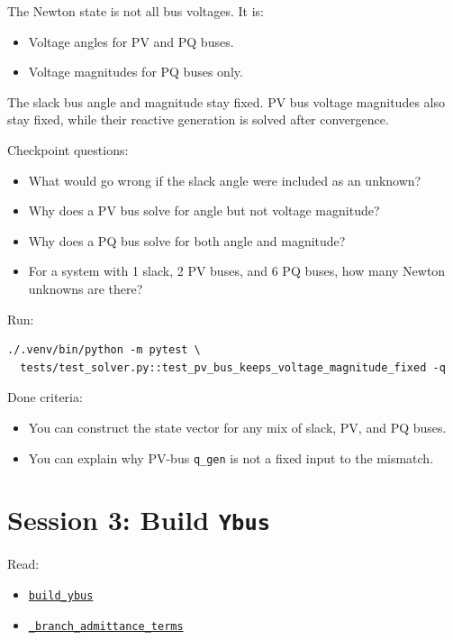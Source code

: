 \documentclass[11pt]{article}
\newcommand{\code}[1]{\texttt{#1}}
\begin{document}
The Newton state is not all bus voltages. It is:

\begin{itemize}
  \item Voltage angles for PV and PQ buses.
  \item Voltage magnitudes for PQ buses only.
\end{itemize}

The slack bus angle and magnitude stay fixed. PV bus voltage magnitudes also
stay fixed, while their reactive generation is solved after convergence.

Checkpoint questions:

\begin{itemize}
  \item What would go wrong if the slack angle were included as an unknown?
  \item Why does a PV bus solve for angle but not voltage magnitude?
  \item Why does a PQ bus solve for both angle and magnitude?
  \item For a system with 1 slack, 2 PV buses, and 6 PQ buses, how many Newton
  unknowns are there?
\end{itemize}

Run:

\begin{verbatim}
./.venv/bin/python -m pytest \
  tests/test_solver.py::test_pv_bus_keeps_voltage_magnitude_fixed -q
\end{verbatim}

Done criteria:

\begin{itemize}
  \item You can construct the state vector for any mix of slack, PV, and PQ
  buses.
  \item You can explain why PV-bus \code{q\_gen} is not a fixed input to the
  mismatch.
\end{itemize}

\section{Session 3: Build \code{Ybus}}

Read:

\begin{itemize}
  \item \href{../src/powerflow/ybus.py\#L10}{\code{build\_ybus}}
  \item \href{../src/powerflow/flows.py\#L23}{\code{\_branch\_admittance\_terms}}
\end{itemize}
\end{document}
